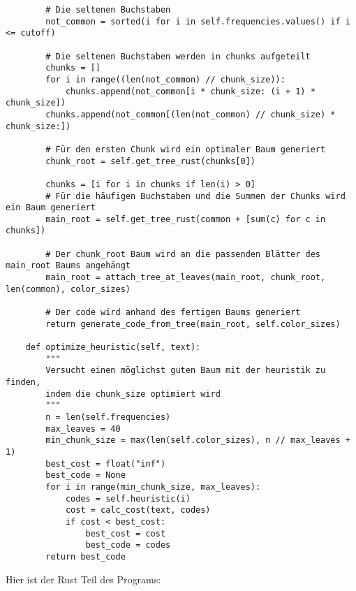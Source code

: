 \documentclass[a4paper,10pt,ngerman]{scrartcl}
\begin{document}
\begin{verbatim}
        # Die seltenen Buchstaben
        not_common = sorted(i for i in self.frequencies.values() if i <= cutoff)

        # Die seltenen Buchstaben werden in chunks aufgeteilt
        chunks = []
        for i in range((len(not_common) // chunk_size)):
            chunks.append(not_common[i * chunk_size: (i + 1) * chunk_size])
        chunks.append(not_common[(len(not_common) // chunk_size) * chunk_size:])

        # Für den ersten Chunk wird ein optimaler Baum generiert
        chunk_root = self.get_tree_rust(chunks[0])

        chunks = [i for i in chunks if len(i) > 0]
        # Für die häufigen Buchstaben und die Summen der Chunks wird ein Baum generiert
        main_root = self.get_tree_rust(common + [sum(c) for c in chunks])

        # Der chunk_root Baum wird an die passenden Blätter des main_root Baums angehängt
        main_root = attach_tree_at_leaves(main_root, chunk_root, len(common), color_sizes)

        # Der code wird anhand des fertigen Baums generiert
        return generate_code_from_tree(main_root, self.color_sizes)

    def optimize_heuristic(self, text):
        """
        Versucht einen möglichst guten Baum mit der heuristik zu finden,
        indem die chunk_size optimiert wird
        """
        n = len(self.frequencies)
        max_leaves = 40
        min_chunk_size = max(len(self.color_sizes), n // max_leaves + 1)
        best_cost = float("inf")
        best_code = None
        for i in range(min_chunk_size, max_leaves):
            codes = self.heuristic(i)
            cost = calc_cost(text, codes)
            if cost < best_cost:
                best_cost = cost
                best_code = codes
        return best_code
    \end{verbatim}
    Hier ist der Rust Teil des Programs:
\end{document}
